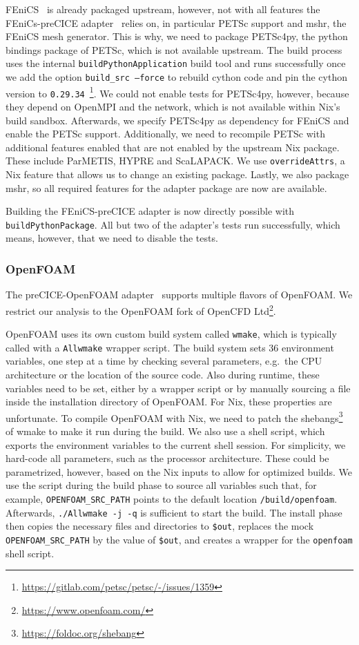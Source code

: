 \documentclass{eceasst}
\begin{document}
FEniCS~\cite{fenics} is already packaged upstream, however, not with all features the FEniCs-preCICE adapter~\cite{Rodenberg2021} relies on, in particular PETSc support and mshr, the FEniCS mesh generator.
This is why, we need to package PETSc4py, the python bindings package of PETSc, which is not available upstream.
The build process uses the internal \texttt{buildPythonApplication} build tool and runs successfully once we add the option \texttt{build\_src --force} to rebuild cython code and pin the cython version to \texttt{0.29.34}~\footnote{\url{https://gitlab.com/petsc/petsc/-/issues/1359}}.
We could not enable tests for PETSc4py, however, because they depend on OpenMPI and the network, which is not available within Nix's build sandbox.
Afterwards, we specify PETSc4py as dependency for FEniCS and enable the PETSc support.
Additionally, we need to recompile PETSc with additional features enabled that are not enabled by the upstream Nix package. These include ParMETIS, HYPRE and ScaLAPACK. We use \texttt{overrideAttrs}, a Nix feature that allows us to change an existing package.
Lastly, we also package mshr, so all required features for the adapter package are now are available.

Building the FEniCS-preCICE adapter is now directly possible with \texttt{buildPythonPackage}.
All but two of the adapter's tests run successfully, which means, however, that we need to disable the tests.

\subsubsection{OpenFOAM}

The preCICE-OpenFOAM adapter~\cite{OpenFOAMpreCICE} supports multiple flavors of OpenFOAM. We restrict our analysis to the OpenFOAM fork of OpenCFD Ltd\footnote{\url{https://www.openfoam.com/}}.

OpenFOAM uses its own custom build system called \texttt{wmake}, which is typically called with a \texttt{Allwmake} wrapper script.
The build system sets 36 environment variables, one step at a time by checking several parameters, e.g.~the CPU architecture or the location of the source code. Also during runtime, these variables need to be set, either by a wrapper script or by manually sourcing a file inside the installation directory of OpenFOAM.
For Nix, these properties are unfortunate. To compile OpenFOAM with Nix, we need to patch the shebangs\footnote{\url{https://foldoc.org/shebang}} of wmake to make it run during the build.
We also use a shell script, which exports the environment variables to the current shell session.
For simplicity, we hard-code all parameters, such as the processor architecture. These could be parametrized, however, based on the Nix inputs to allow for optimized builds. We use the script during the build phase to source all variables such that, for example, \texttt{OPENFOAM\_SRC\_PATH} points to the default location \texttt{/build/openfoam}.
Afterwards, \texttt{./Allwmake -j -q} is sufficient to start the build.
The install phase then copies the necessary files and directories to \texttt{\$out}, replaces the mock \texttt{OPENFOAM\_SRC\_PATH} by the value of \texttt{\$out}, and creates a wrapper for the \texttt{openfoam} shell script.
\end{document}
